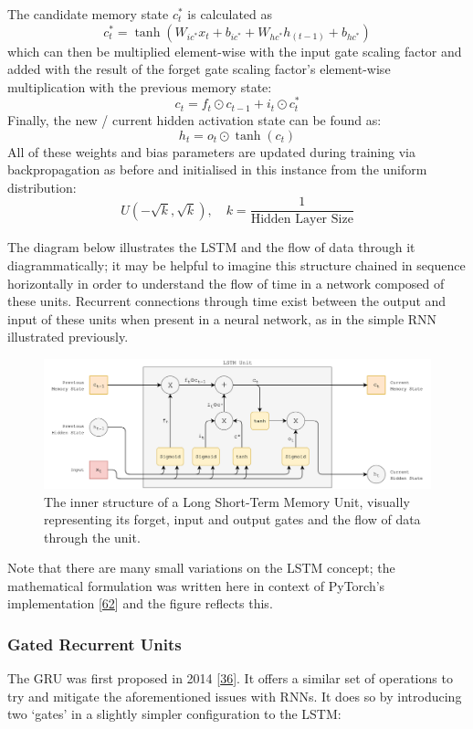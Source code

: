 \documentclass[12pt,]{article}
\begin{document}
The candidate memory state \(c^*_t\) is calculated as
\[c^*_t = \tanh(W_{ic^*} x_t + b_{ic^*} + W_{hc^*} h_{(t-1)} + b_{hc^*})\]
which can then be multiplied element-wise with the input gate scaling
factor and added with the result of the forget gate scaling factor's
element-wise multiplication with the previous memory state:
\[c_t = f_t \odot c_{t-1} + i_t \odot c^*_t\] Finally, the new / current
hidden activation state can be found as: \[h_t = o_t \odot \tanh(c_t)\]
All of these weights and bias parameters are updated during training via
backpropagation as before and initialised in this instance from the
uniform distribution:
\[U(-\sqrt{k}, \sqrt{k}),\quad k = \frac{1}{\text{Hidden Layer Size}}\]

The diagram below illustrates the LSTM and the flow of data through it
diagrammatically; it may be helpful to imagine this structure chained in
sequence horizontally in order to understand the flow of time in a
network composed of these units. Recurrent connections through time
exist between the output and input of these units when present in a
neural network, as in the simple RNN illustrated previously.

\begin{figure}
\centering
\includegraphics{Images/lstm.png}
\caption{The inner structure of a Long Short-Term Memory Unit, visually
representing its forget, input and output gates and the flow of data
through the unit.}
\end{figure}

Note that there are many small variations on the LSTM concept; the
mathematical formulation was written here in context of PyTorch's
implementation {[}\protect\hyperlink{ref-pytorchlstm}{62}{]} and the
figure reflects this.

\hypertarget{gated-recurrent-units}{%
\subsubsection{Gated Recurrent Units}\label{gated-recurrent-units}}

The GRU was first proposed in 2014
{[}\protect\hyperlink{ref-cho2014learning}{36}{]}. It offers a similar
set of operations to try and mitigate the aforementioned issues with
RNNs. It does so by introducing two `gates' in a slightly simpler
configuration to the LSTM:
\end{document}
